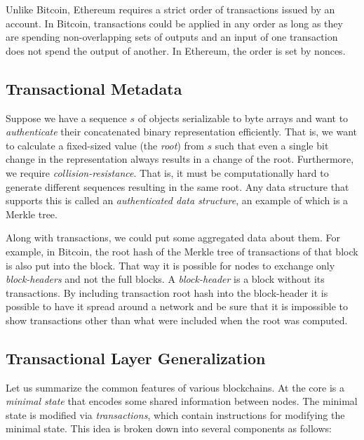 \documentclass[]{report}   %
\newcommand{\authnote}[2]{\marginpar{\parbox{\marginparwidth}{\tiny %
  \textsf{#1 {\textcolor{blue}{notes: #2}}}}}%
  \textcolor{blue}{\textbf{\dag}}}
\newcommand{\authnote}[2]{
  \textsf{#1 \textcolor{blue}{: #2}}}
\newcommand{\authnote}[2]{}
\newcommand{\knote}[1]{{\authnote{\textcolor{green}{Alex notes}}{#1}}}
\begin{document}
Unlike Bitcoin, Ethereum requires a strict order of transactions issued by an account. In Bitcoin, transactions could be applied in any order as long as they are spending non-overlapping sets of outputs and an input of one transaction does not spend the output of another. In Ethereum, the order is set by nonces. 



\subsection{Transactional Metadata}

Suppose we have a sequence $s$ of objects serializable to byte arrays and want to \textit{authenticate} their concatenated binary representation efficiently. That is, we want to calculate a fixed-sized value (the {\em root}) from $s$ such that even a single bit change in the representation always results in a change of the root. Furthermore, we require {\em collision-resistance}. That is, it must be computationally hard to generate different sequences resulting in the same root. Any data structure that supports this is called an {\em authenticated data structure}, an example of which is a Merkle tree.

Along with transactions, we could put some aggregated data about them. For example, in Bitcoin, the root hash of the Merkle tree of transactions of that block is also put into the block. That way it is possible for nodes to exchange only {\em block-headers} and not the full blocks. A \textit{block-header} is a block without its transactions. 
By including transaction root hash into the block-header it is possible to have it spread around a network and be sure that it is impossible to show transactions other than what were included when the root was computed. 


\subsection{Transactional Layer Generalization}

\knote{Sounds unfinished, we need to say this is just about transactions and state.}

Let us summarize the common features of various blockchains. At the core is a {\em minimal state} that encodes some shared information between nodes. The minimal state is modified via {\em transactions}, which contain instructions for modifying the minimal state. This idea is broken down into several components as follows:
\end{document}
